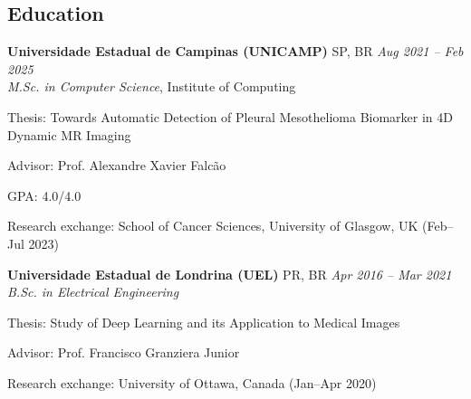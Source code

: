 \documentclass[margin,line]{resume}
\begin{document}
\begin{resume}
       \section{\mysidestyle Education}     
        \textbf{Universidade Estadual de Campinas (UNICAMP)} SP, BR  \hfill \textsl{Aug 2021 -- Feb 2025}\\
           \textit{M.Sc. in Computer Science}, Institute of Computing
           \begin{list2}
            \item Thesis: Towards Automatic Detection of Pleural Mesothelioma Biomarker in 4D Dynamic MR Imaging~\cite{theodoro2025mesothelioma}
            \item Advisor: Prof. Alexandre Xavier Falcão
            \item GPA: 4.0/4.0
            \item Research exchange: School of Cancer Sciences, University of Glasgow, UK (Feb--Jul 2023)
           \end{list2}
        \textbf{Universidade Estadual de Londrina (UEL)} PR, BR  \hfill \textsl{Apr 2016 -- Mar 2021}\\
           \textit{B.Sc. in Electrical Engineering}
           \begin{list2}
            \item Thesis: Study of Deep Learning and its Application to Medical Images
            \item Advisor: Prof. Francisco Granziera Junior
            \item Research exchange: University of Ottawa, Canada (Jan--Apr 2020)
           \end{list2}
     \vspace{-0.3cm}

\end{resume}
\end{document}
